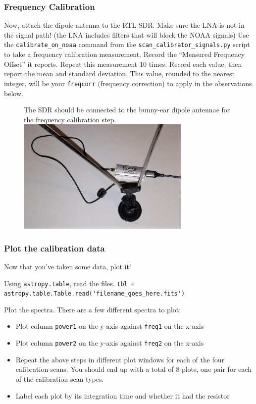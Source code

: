 \documentclass[11pt]{article}
\begin{document}
\subsubsection{Frequency Calibration}
\label{sec:freqcal}
Now, attach the dipole antenna to the RTL-SDR.
Make sure the LNA is not in the signal path!  (the LNA includes filters that will block the NOAA signals)
Use the \verb|calibrate_on_noaa| command from the \verb|scan_calibrator_signals.py|
script to take a frequency calibration measurement.
Record the ``Measured Frequency Offset'' it reports.
Repeat this measurement 10 times.
Record each value, then report the mean and standard deviation.
This value, rounded to the nearest integer, will be your \verb|freqcorr| (frequency correction)
to apply in the observations below.

\begin{figure}[htp]
    \centering
    The SDR should be connected to the bunny-ear dipole antennae for the frequency calibration step.\\
\includegraphics[width=0.75\textwidth]{RadioLabPhotos/sdr_to_bunnyears.jpg}
\end{figure}


\subsubsection{Plot the calibration data}
Now that you've taken some data, plot it!

Using \texttt{astropy.table}, read the files.
\verb|tbl = astropy.table.Table.read('filename_goes_here.fits')|

Plot the spectra.  There are a few different spectra to plot:
\begin{itemize}
    \item Plot column \verb|power1| on the y-axis against \verb|freq1| on the x-axis
    \item Plot column \verb|power2| on the y-axis against \verb|freq2| on the x-axis
    \item Repeat the above steps in different plot windows for each of the four
        calibration scans.  You should end up with a total of 8 plots, one pair for
        each of the calibration scan types.
    \item Label each plot by its integration time and whether it had the resistor
\end{itemize}
\end{document}
